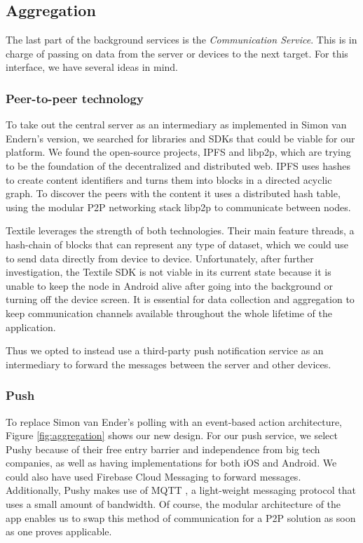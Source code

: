 \subsection{Aggregation}
The last part of the background services is the \textit{Communication Service}. This is in charge of passing on data from the server or devices to the next target. For this interface, we have several ideas in mind.
 
\subsubsection{Peer-to-peer technology}
To take out the central server as an intermediary as implemented in Simon van Endern's version, we searched for libraries and SDKs that could be viable for our platform. We found the open-source projects, IPFS and libp2p, which are trying to be the foundation of the decentralized and distributed web. IPFS uses hashes to create content identifiers and turns them into blocks in a directed acyclic graph. To discover the peers with the content it uses a distributed hash table, using the modular P2P networking stack libp2p to communicate between nodes.

Textile leverages the strength of both technologies. Their main feature threads, a hash-chain of blocks that can represent any type of dataset, which we could use to send data directly from device to device. Unfortunately, after further investigation, the Textile SDK is not viable in its current state because it is unable to keep the node in Android alive after going into the background or turning off the device screen. It is essential for data collection and aggregation to keep communication channels available throughout the whole lifetime of the application.

Thus we opted to instead use a third-party push notification service as an intermediary to forward the messages between the server and other devices.

\subsubsection{Push}
To replace Simon van Ender's polling with an event-based action architecture, Figure \ref{fig:aggregation} shows our new design. For our push service, we select Pushy
because of their free entry barrier and independence from big tech companies, as well as having implementations for both iOS and Android. We could also have used Firebase Cloud Messaging to forward messages. Additionally, Pushy makes use of MQTT
, a light-weight messaging protocol that uses a small amount of bandwidth. Of course, the modular architecture of the app enables us to swap this method of communication for a P2P solution as soon as one proves applicable.

